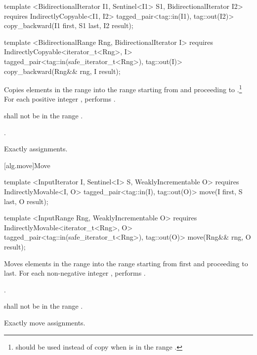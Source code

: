 %
\begin{itemdecl}
template <BidirectionalIterator I1, Sentinel<I1> S1, BidirectionalIterator I2>
  requires IndirectlyCopyable<I1, I2>
  tagged_pair<tag::in(I1), tag::out(I2)>
    copy_backward(I1 first, S1 last, I2 result);

template <BidirectionalRange Rng, BidirectionalIterator I>
  requires IndirectlyCopyable<iterator_t<Rng>, I>
  tagged_pair<tag::in(safe_iterator_t<Rng>), tag::out(I)>
    copy_backward(Rng&& rng, I result);
\end{itemdecl}

\begin{itemdescr}
\pnum
\effects
Copies elements in the range 
into the
range 
starting from
and proceeding to .\footnote{
should be used instead of copy when 
is in
the range
.}
For each positive integer
,
performs
.

\pnum
\requires
{}
shall not be in the range
.

\pnum
\returns
{}.

\pnum
\complexity
Exactly
assignments.
\end{itemdescr}

[alg.move]{Move}

%
\begin{itemdecl}
template <InputIterator I, Sentinel<I> S, WeaklyIncrementable O>
  requires IndirectlyMovable<I, O>
  tagged_pair<tag::in(I), tag::out(O)>
    move(I first, S last, O result);

template <InputRange Rng, WeaklyIncrementable O>
  requires IndirectlyMovable<iterator_t<Rng>, O>
  tagged_pair<tag::in(safe_iterator_t<Rng>), tag::out(O)>
    move(Rng&& rng, O result);
\end{itemdecl}

\begin{itemdescr}
\pnum
\effects
Moves elements in the range 
into the range 
starting from first and proceeding to last.
For each non-negative integer
,
performs
 .

\pnum
\returns
{}.

\pnum
\requires
{}
shall not be in the range
.

\pnum
\complexity
Exactly
move assignments.
\end{itemdescr}

